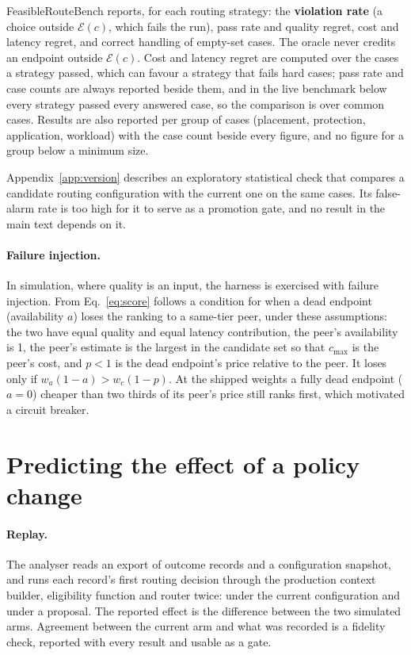 \documentclass[11pt]{article}
\newcommand{\E}{\mathcal{E}}
\begin{document}
FeasibleRouteBench reports, for each routing strategy: the \textbf{violation rate} (a choice
outside $\E(c)$, which fails the run), pass rate and quality regret, cost and latency regret,
and correct handling of empty-set cases. The oracle never credits an endpoint outside $\E(c)$.
Cost and latency regret are computed over the cases a strategy passed, which can favour a
strategy that fails hard cases; pass rate and case counts are always reported beside them,
and in the live benchmark below every strategy passed every answered case, so the comparison is
over common cases. Results are also reported per group of cases (placement, protection,
application, workload) with the case count beside every figure, and no figure for a group below
a minimum size.

Appendix~\ref{app:version} describes an exploratory statistical check that compares a candidate
routing configuration with the current one on the same cases. Its false-alarm rate is too high
for it to serve as a promotion gate, and no result in the main text depends on it.

\paragraph{Failure injection.} In simulation, where quality is an input, the harness is
exercised with failure injection. From Eq.~\eqref{eq:score} follows a condition for when a dead
endpoint (availability $a$) loses the ranking to a same-tier peer, under these assumptions: the
two have equal quality and equal latency contribution, the peer's availability is 1, the
peer's estimate is the largest in the candidate set so that $c_{\max}$ is the peer's cost, and
$p<1$ is the dead endpoint's price relative to the peer. It loses only if
$w_a (1 - a) > w_c (1 - p)$. At the shipped weights a fully dead endpoint ($a = 0$) cheaper than
two thirds of its peer's price still ranks first, which motivated a circuit breaker.

\section{Predicting the effect of a policy change}
\label{sec:sim}

\paragraph{Replay.} The analyser reads an export of outcome records and a configuration
snapshot, and runs each record's first routing decision through the production context
builder, eligibility function and router twice: under the current configuration and under a
proposal. The reported effect is the difference between the two simulated arms. Agreement
between the current arm and what was recorded is a fidelity check, reported with every result
and usable as a gate.
\end{document}
